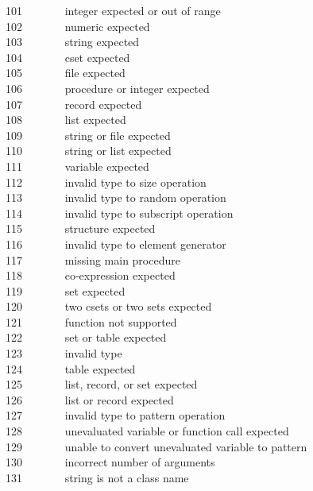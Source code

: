 101 \ \ \ \ \ \ \ integer expected or out of range\\
102 \ \ \ \ \ \ \ numeric expected\\
103 \ \ \ \ \ \ \ string expected\\
104 \ \ \ \ \ \ \ cset expected\\
105 \ \ \ \ \ \ \ file expected\\
106 \ \ \ \ \ \ \ procedure or integer expected\\
107 \ \ \ \ \ \ \ record expected\\
108 \ \ \ \ \ \ \ list expected\\
109 \ \ \ \ \ \ \ string or file expected\\
110 \ \ \ \ \ \ \ string or list expected\\
111 \ \ \ \ \ \ \ variable expected\\
112 \ \ \ \ \ \ \ invalid type to size operation\\
113 \ \ \ \ \ \ \ invalid type to random operation\\
114 \ \ \ \ \ \ \ invalid type to subscript operation\\
115 \ \ \ \ \ \ \ structure expected\\
116 \ \ \ \ \ \ \ invalid type to element generator\\
117 \ \ \ \ \ \ \ missing main procedure\\
118 \ \ \ \ \ \ \ co-expression expected\\
119 \ \ \ \ \ \ \ set expected\\
120 \ \ \ \ \ \ \ two csets or two sets expected\\
121 \ \ \ \ \ \ \ function not supported\\
122 \ \ \ \ \ \ \ set or table expected\\
123 \ \ \ \ \ \ \ invalid type\\
124 \ \ \ \ \ \ \ table expected\\
125 \ \ \ \ \ \ \ list, record, or set expected\\
126 \ \ \ \ \ \ \ list or record expected\\
127 \ \ \ \ \ \ \ invalid type to pattern operation\\
128 \ \ \ \ \ \ \ unevaluated variable or function call expected\\
129 \ \ \ \ \ \ \ unable to convert unevaluated variable to pattern\\
130 \ \ \ \ \ \ \ incorrect number of arguments\\
131 \ \ \ \ \ \ \ string is not a class name\\
